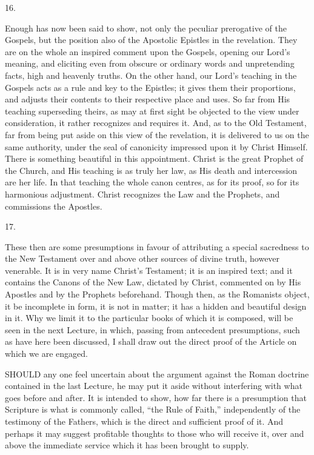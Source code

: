 16.

Enough has now been said to show, not only the peculiar prerogative
of the Gospels, but the position also of the Apostolic Epistles in the
revelation. They are on the whole an inspired comment upon the
Gospels, opening our Lord's meaning, and eliciting even from obscure
or ordinary words and unpretending facts, high and heavenly truths. On
the other hand, our Lord's teaching in the Gospels acts as a rule and
key to the Epistles; it gives them their proportions, and adjusts
their contents to their respective place and uses. So far from His
teaching superseding theirs, as may at first sight be objected to the
view under consideration, it rather recognizes and requires it. And,
as to the Old Testament, far from being put aside on this view of the
revelation, it is delivered to us on the same authority, under the
seal of canonicity impressed upon it by Christ Himself. There is
something beautiful in this appointment. Christ is the great Prophet
of the Church, and His teaching is as truly her law, as His death and
intercession are her life. In that teaching the whole canon centres,
as for its proof, so for its harmonious adjustment. Christ recognizes
the Law and the Prophets, and commissions the Apostles.

17.

These then are some presumptions in favour of attributing a special
sacredness to the New Testament over and above other sources of divine
truth, however venerable. It is in very name Christ's Testament; it is
an inspired text; and it contains the Canons of the New Law, dictated
by Christ, commented on by His Apostles and by the Prophets
beforehand. Though then, as the Romanists object, it be incomplete in
form, it is not in matter; it has a hidden and beautiful design in it.
Why we limit it to the particular books of which it is composed, will
be seen in the next Lecture, in which, passing from antecedent
presumptions, such as have here been discussed, I shall draw out the
direct proof of the Article on which we are engaged.


SHOULD any one feel uncertain about the
argument against the Roman doctrine contained in the last Lecture, he
may put it aside without interfering with what goes before and after.
It is intended to show, how far there is a presumption that Scripture
is what is commonly called, ``the Rule of Faith,''
independently of the testimony of the Fathers, which is the direct and
sufficient proof of it. And perhaps it may suggest profitable thoughts
to those who will receive it, over and above the immediate service
which it has been brought to supply.

